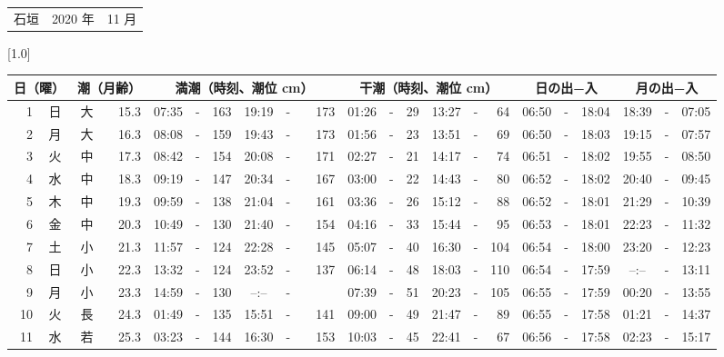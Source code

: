 \documentclass[12pt,a4j]{jsarticle}
\begin{document}
 \begin{table}[htbp]
 \begin{center}
 \begin{tabular}{lcc}
 \LARGE{石垣}  & \large{2020 年} & \large{11 月} \\
 \end{tabular}
 \end{center}
 \begin{center}
    \scalebox{0.7}[1.0]{
    \begin{tabular}{|rc|cr|ccrccr|ccrccr|ccc|ccc|}
    \hline
    \multicolumn{2}{|c|}{日（曜）} & \multicolumn{2}{c|}{潮（月齢）} & \multicolumn{6}{c|}{満潮（時刻、潮位 cm）} & \multicolumn{6}{c|}{干潮（時刻、潮位 cm）} & \multicolumn{3}{c|}{日の出−入} &  \multicolumn{3}{c|}{月の出−入}\\
 \hline
 1 & 日 & 大 & 15.3 &  07:35 &-& 163 &  19:19 &-& 173 &  01:26 &-&  29 &  13:27 &-&  64 & 06:50 & -& 18:04 & 18:39 & -& 07:05 \\
 2 & 月 & 大 & 16.3 &  08:08 &-& 159 &  19:43 &-& 173 &  01:56 &-&  23 &  13:51 &-&  69 & 06:50 & -& 18:03 & 19:15 & -& 07:57 \\
 3 & 火 & 中 & 17.3 &  08:42 &-& 154 &  20:08 &-& 171 &  02:27 &-&  21 &  14:17 &-&  74 & 06:51 & -& 18:02 & 19:55 & -& 08:50 \\
 4 & 水 & 中 & 18.3 &  09:19 &-& 147 &  20:34 &-& 167 &  03:00 &-&  22 &  14:43 &-&  80 & 06:52 & -& 18:02 & 20:40 & -& 09:45 \\
 5 & 木 & 中 & 19.3 &  09:59 &-& 138 &  21:04 &-& 161 &  03:36 &-&  26 &  15:12 &-&  88 & 06:52 & -& 18:01 & 21:29 & -& 10:39 \\
 6 & 金 & 中 & 20.3 &  10:49 &-& 130 &  21:40 &-& 154 &  04:16 &-&  33 &  15:44 &-&  95 & 06:53 & -& 18:01 & 22:23 & -& 11:32 \\
 7 & 土 & 小 & 21.3 &  11:57 &-& 124 &  22:28 &-& 145 &  05:07 &-&  40 &  16:30 &-& 104 & 06:54 & -& 18:00 & 23:20 & -& 12:23 \\
 8 & 日 & 小 & 22.3 &  13:32 &-& 124 &  23:52 &-& 137 &  06:14 &-&  48 &  18:03 &-& 110 & 06:54 & -& 17:59 & --:-- & -& 13:11 \\
 9 & 月 & 小 & 23.3 &  14:59 &-& 130 &  --:-- &-&~~~~~ &  07:39 &-&  51 &  20:23 &-& 105 & 06:55 & -& 17:59 & 00:20 & -& 13:55 \\
10 & 火 & 長 & 24.3 &  01:49 &-& 135 &  15:51 &-& 141 &  09:00 &-&  49 &  21:47 &-&  89 & 06:55 & -& 17:58 & 01:21 & -& 14:37 \\
11 & 水 & 若 & 25.3 &  03:23 &-& 144 &  16:30 &-& 153 &  10:03 &-&  45 &  22:41 &-&  67 & 06:56 & -& 17:58 & 02:23 & -& 15:17 \\

\end{tabular}}
\end{center}
\end{table}
\end{document}
